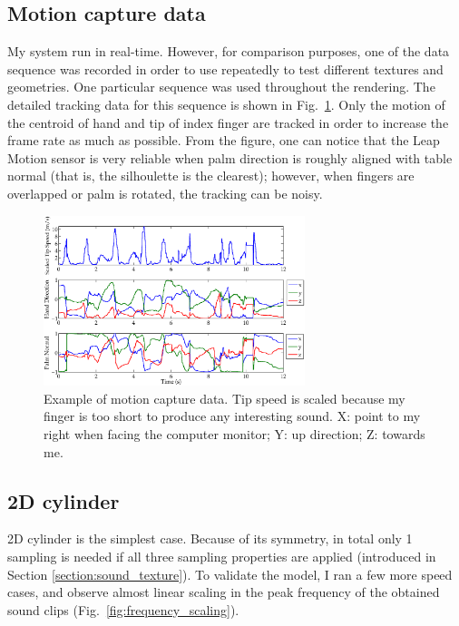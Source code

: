 \documentclass[tog]{acmsiggraph}
\begin{document}
\subsection{Motion capture data} 
My system run in real-time. However, for comparison purposes, one of the data sequence was recorded in order to use repeatedly to test different textures and geometries. One particular sequence was used throughout the rendering. The detailed tracking data for this sequence is shown in Fig.~\ref{fig:mocap}. Only the motion of the centroid of hand and tip of index finger are tracked in order to increase the frame rate as much as possible. From the figure, one can notice that the Leap Motion sensor is very reliable when palm direction is roughly aligned with table normal (that is, the silhoulette is the clearest); however, when fingers are overlapped or palm is rotated, the tracking can be noisy.  

\begin{figure}[ht]
  \centering
  \includegraphics[width=3.0in]{images/mocap.eps}
  \caption{Example of motion capture data. Tip speed is scaled because my finger is too short to produce any interesting sound. X: point to my right when facing the computer monitor; Y: up direction; Z: towards me.}
  \label{fig:mocap}
\end{figure}

\subsection{2D cylinder} 
2D cylinder is the simplest case. Because of its symmetry, in total only 1 sampling is needed if all three sampling properties are applied (introduced in Section \ref{section:sound_texture}). To validate the model, I ran a few more speed cases, and observe almost linear scaling in the peak frequency of the obtained sound clips (Fig.~\ref{fig:frequency_scaling}).
\end{document}
